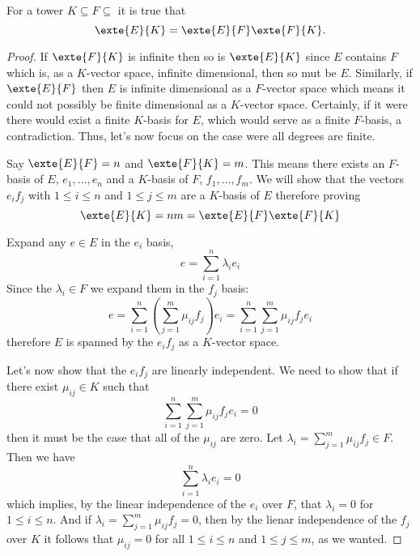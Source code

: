 \documentclass[12pt,oneside]{book}
\begin{document}
\begin{theorem} \label{theo:tower formula}
	For a tower \( K \subseteq F \subseteq \) it is true that
	\begin{equation*}
		\exte{E}{K} = \exte{E}{F} \exte{F}{K}.
	\end{equation*}
\end{theorem}
\begin{proof}
	If \( \exte{F}{K} \) is infinite then so is \( \exte{E}{K} \) since \( E \) contains \(
	F\) which is, as a \( K \)-vector space, infinite dimensional, then so mut be \( E \).
	Similarly, if \( \exte{E}{F} \) then \( E \) is infinite dimensional as a \( F \)-vector
	space which means it could not possibly be finite dimensional as a \( K \)-vector space.
	Certainly, if it were there would exist a finite \( K \)-basis for \( E \), which would
	serve as a finite \( F \)-basis, a contradiction. Thus, let's now focus on the case were
	all degrees are finite.

	Say \( \exte{E}{F} = n \) and \( \exte{F}{K} = m \). This means there exists an \( F
	\)-basis of \( E \), \( e_1, \dots, e_n \) and a \( K \)-basis of \( F \), \( f_1,
	\dots, f_m \). We will show that the vectors \( e_if_j \) with \( 1 \leq i \leq n \) and
	\( 1 \leq j \leq m \) are a \( K \)-basis of \( E \) therefore proving
	\begin{equation*}
		\exte{E}{K} = nm = \exte{E}{F} \exte{F}{K}
	\end{equation*}
	
	Expand any \( e \in E \) in the \( e_i \) basis,
	\begin{equation*}
		e = \sum_{i = 1}^{n} \lambda_i e_i 
	\end{equation*}
	Since the \( \lambda_i \in F \) we expand them in the \( f_j \) basis:
	\begin{equation*}
		e = \sum_{i = 1}^{n} \left(\sum_{j = 1}^{m} \mu_{ij} f_j\right)  e_i = \sum_{i =
		1}^{n} \sum_{j = 1}^{m} \mu_{ij} f_j  e_i
	\end{equation*}
	therefore \( E \) is spanned by the \( e_if_j \) as a \( K \)-vector space.	

	Let's now show that the \( e_if_j \) are linearly independent. We need to show that if
	there exist \( \mu_{ij}\in K \) such that
	\begin{equation*}
		\sum_{i =	1}^{n} \sum_{j = 1}^{m} \mu_{ij} f_j  e_i = 0
	\end{equation*}
	then it must be the case that all of the \( \mu_{ij} \) are zero. Let \( \lambda_i =
	\sum_{j = 1}^{m}\mu_{ij}f_j \in F  \). Then we have
	\begin{equation*}
		\sum_{i = 1}^{n}\lambda_i e_i = 0 
	\end{equation*}
	which implies, by the linear independence of the \( e_i \) over \( F \), that \(
	\lambda_i = 0 \) for	\( 1 \leq i \leq n \). And if \( \lambda_i = \sum_{j =
	1}^{m}\mu_{ij}f_j = 0  \), then	by the lienar independence of the \( f_j \) over \( K \)
	it follows that \( \mu_{ij} = 0 \) for all \( 1 \leq i \leq n \) and \( 1 \leq j \leq m
	\), as we wanted.
\end{proof}
\end{document}
